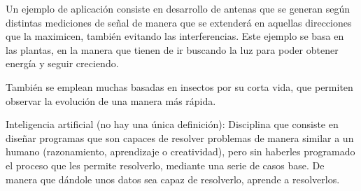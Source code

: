 \documentclass[12pt, twoside, openright]{report} %
\begin{document}
Un ejemplo de aplicación consiste en desarrollo de antenas que se generan según distintas mediciones de señal de manera que se extenderá en aquellas direcciones que la maximicen, también evitando las interferencias. Este ejemplo se basa en las plantas, en la manera que tienen de ir buscando la luz para poder obtener energía y seguir creciendo.

También se emplean muchas basadas en insectos por su corta vida, que permiten observar la evolución de una manera más rápida.

Inteligencia artificial (no hay una única definición): Disciplina que consiste en diseñar programas que son capaces de resolver problemas de manera similar a un humano (razonamiento, aprendizaje o creatividad), pero sin haberles programado el proceso que les permite resolverlo, mediante una serie de casos base. De manera que dándole unos datos sea capaz de resolverlo, aprende a resolverlos.
\end{document}
